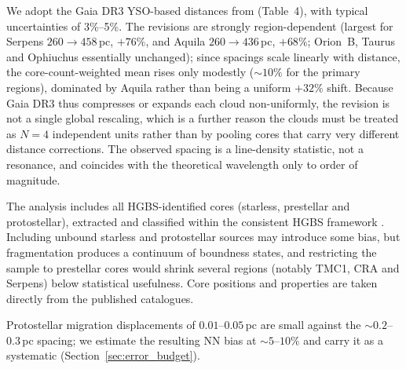 \documentclass[usenatbib,twoside,twocolumn]{mnras}
\begin{document}
We adopt the Gaia DR3 YSO-based distances from \citet{Zhang2023} (Table~4), with typical uncertainties of 3\%--5\%. The revisions are strongly region-dependent (largest for Serpens $260\to458$\,pc, $+76\%$, and Aquila $260\to436$\,pc, $+68\%$; Orion~B, Taurus and Ophiuchus essentially unchanged); since spacings scale linearly with distance, the core-count-weighted mean rises only modestly ($\sim10\%$ for the primary regions), dominated by Aquila rather than being a uniform $+32\%$ shift. Because Gaia DR3 thus compresses or expands each cloud non-uniformly, the revision is not a single global rescaling, which is a further reason the clouds must be treated as $N=4$ independent units rather than by pooling cores that carry very different distance corrections. The observed spacing is a line-density statistic, not a resonance, and coincides with the theoretical wavelength only to order of magnitude.

The analysis includes all HGBS-identified cores (starless, prestellar and protostellar), extracted and classified within the consistent HGBS framework \citep{Konyves2015, Konyves2020}. Including unbound starless and protostellar sources may introduce some bias, but fragmentation produces a continuum of boundness states, and restricting the sample to prestellar cores would shrink several regions (notably TMC1, CRA and Serpens) below statistical usefulness. Core positions and properties are taken directly from the published catalogues.

Protostellar migration displacements of $0.01$--$0.05$\,pc \citep{Kirk2016, Mattern2018} are small against the $\sim0.2$--$0.3$\,pc spacing; we estimate the resulting NN bias at $\sim5$--$10\%$ and carry it as a systematic (Section~\ref{sec:error_budget}).
\end{document}
